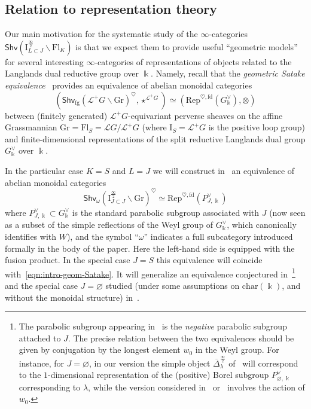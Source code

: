 \documentclass[11pt]{amsart}
\numberwithin{equation}{section}
\theoremstyle{plain}
\theoremstyle{definition}
\newcommand{\I}{{\mathrm I}}
\renewcommand{\k}{\Bbbk}
\newcommand{\sL}{{\mathcal L}}
\newcommand{\Rep}{\mathrm{Rep}}
\newcommand{\semi}{{{\frac{\infty}{2}}}}
\newcommand{\Shv}{\mathsf{Shv}}
\newcommand{\Shvfg}{\mathsf{Shv}_{\mathrm{fg}}}
\newcommand{\Fl}{\mathrm{Fl}}
\newcommand{\Gr}{\mathrm{Gr}}
\newcommand{\fd}{\mathrm{fd}}
\begin{document}
\subsection{Relation to representation theory}
\label{ss:into-RT}

Our main motivation for the systematic study of the $\infty$-categories $\Shv \left( \I^\semi_{L \subset J} \backslash \Fl_K \right)$ is that we expect them to provide useful ``geometric models'' for several interesting $\infty$-categories of representations of objects related to the Langlands dual reductive group over $\k$. Namely, recall that the \emph{geometric Satake equivalence}~\cite{mv} provides an equivalence of abelian monoidal categories
\begin{equation}
\label{eqn:intro-geom-Satake}
(\Shvfg(\sL^+ G \backslash \Gr)^\heartsuit, \star^{\sL^+ G}) \simeq (\Rep^{\heartsuit,\fd}(G^\vee_\k), \otimes)
\end{equation}
between (finitely generated) $\sL^+G$-equivariant perverse sheaves on the affine Grassmannian $\Gr=\Fl_S = \sL G / \sL^+ G$ (where $\I_S = \sL^+ G$ is the positive loop group) and finite-dimensional representations of the split reductive Langlands dual group $G^\vee_\k$ over $\k$. 

In the particular case $K=S$ and $L=J$ we will construct in~\cite{adrs} an equivalence of abelian monoidal categories
\begin{equation}
\label{eqn:intro-Satake-parabolic}
 \Shv_\omega \left( \I^\semi_{J \subset J} \backslash \Gr \right)^\heartsuit \simeq \Rep^{\heartsuit,\fd}(P_{J,\k}^\vee)
\end{equation}
where $P^\vee_{J,\k} \subset G^\vee_\k$ is the standard parabolic subgroup associated with $J$ (now seen as a subset of the simple reflections of the Weyl group of $G^\vee_\k$, which canonically identifies with $W$), and the symbol ``$\omega$'' indicates a full subcategory introduced formally in the body of the paper. Here the left-hand side is equipped with the fusion product. In the special case $J=S$ this equivalence will coincide with~\eqref{eqn:intro-geom-Satake}. It will generalize an equivalence conjectured in~\cite[\S 1.3.3]{DL23}\footnote{The parabolic subgroup appearing in~\cite[\S 1.3.3]{DL23} is the \emph{negative} parabolic subgroup attached to $J$. The precise relation between the two equivalences should be given by conjugation by the longest element $w_0$ in the Weyl group. For instance, for $J=\varnothing$, in our version the simple object $\overline{\Delta}^\semi_\lambda$ of~\cite[Proposition~6.20]{adr} will correspond to the $1$-dimensional representation of the (positive) Borel subgroup $P^\vee_{\varnothing,\k}$ corresponding to $\lambda$, while the version considered in~\cite{DL23} or~\cite[Proposition~1.5.7]{Gaits18} involves the action of $w_0$.} and the special case $J=\varnothing$ studied (under some assumptions on $\mathrm{char}(\k)$, and without the monoidal structure) in~\cite{adr-Gr}.
\end{document}
